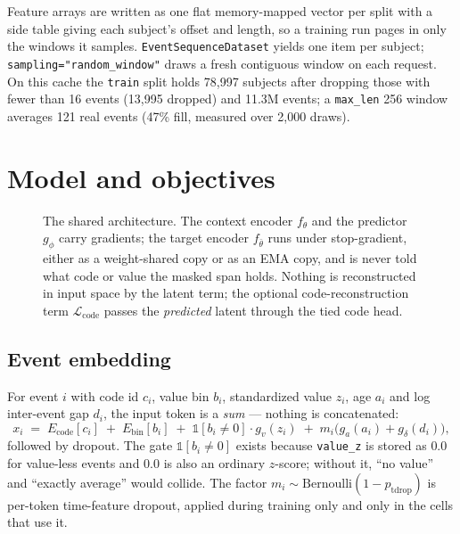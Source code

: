 \documentclass[11pt,a4paper]{article}
\newcommand{\code}[1]{\texttt{\small #1}}
\begin{document}
Feature arrays are written as one flat memory-mapped vector per split with a
side table giving each subject's offset and length, so a training run pages in
only the windows it samples. \code{EventSequenceDataset} yields one item per
subject; \code{sampling="random\_window"} draws a fresh contiguous window on
each request. On this cache the \code{train} split holds 78{,}997 subjects
after dropping those with fewer than 16 events (13{,}995 dropped) and 11.3M
events; a \code{max\_len} 256 window averages 121 real events (47\% fill,
measured over 2{,}000 draws).

\section{Model and objectives}
\label{sec:model}

\begin{figure}[t]
\centering
\resizebox{\textwidth}{!}{}
\caption{The shared architecture. The context encoder $f_\theta$ and the
predictor $g_\phi$ carry gradients; the target encoder $f_{\bar\theta}$ runs
under stop-gradient, either as a weight-shared copy or as an EMA copy, and is
never told what code or value the masked span holds. Nothing is reconstructed
in input space by the latent term; the optional code-reconstruction term
$\mathcal{L}_{\mathrm{code}}$ passes the \emph{predicted} latent through the
tied code head.}
\label{fig:arch}
\end{figure}

\subsection{Event embedding}

For event $i$ with code id $c_i$, value bin $b_i$, standardized value $z_i$,
age $a_i$ and log inter-event gap $d_i$, the input token is a \emph{sum} ---
nothing is concatenated:
\begin{equation}
x_i \;=\; E_{\mathrm{code}}[c_i] \;+\; E_{\mathrm{bin}}[b_i]
      \;+\; \mathbb{1}[b_i \neq 0]\cdot g_{v}(z_i)
      \;+\; m_i\big(g_{a}(a_i) + g_{\delta}(d_i)\big),
\label{eq:embed}
\end{equation}
followed by dropout. The gate $\mathbb{1}[b_i \neq 0]$ exists because
\code{value\_z} is stored as $0.0$ for value-less events and $0.0$ is also an
ordinary $z$-score; without it, ``no value'' and ``exactly average'' would
collide. The factor $m_i \sim \mathrm{Bernoulli}(1 - p_{\mathrm{tdrop}})$ is
per-token time-feature dropout, applied during training only and only in the
cells that use it.
\end{document}
